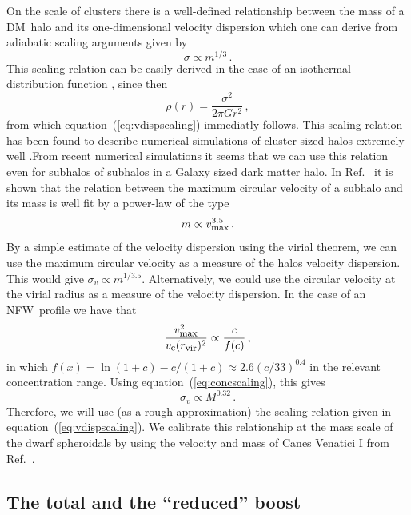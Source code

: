 \documentclass[aps,prd,twocolumn,amsmath,amssymb,floatfix,nofootinbib,10pt]{revtex4}
\newcommand{\NFW}{NFW}
\newcommand{\DM}{DM}
\newcommand{\eqnname}{equation}
\newcommand{\sigv}{\ensuremath{\sigma_v}}
\newcommand{\Rvir}{\ensuremath{r_{\mbox{{\footnotesize vir}}}}}
\newcommand{\vcirc}{\ensuremath{v_{\mbox{{\footnotesize c}}}}}
\newcommand{\vmax}{\ensuremath{v_{\mbox{{\footnotesize max}}}}}
\begin{document}
On the scale of clusters there is a well-defined relationship between
the mass of a \DM\ halo and its one-dimensional velocity dispersion
which one can derive from adiabatic scaling arguments
\cite{1998ApJ...495...80B} given by
\begin{equation}\label{eq:vdispscaling}
\sigma \propto m^{1/3}\, .
\end{equation}
This scaling relation can be easily derived in the case of an
isothermal distribution function \cite{2008gady.book.....B}, since
then
\begin{equation}
\rho(r) = \frac{\sigma^2}{2\pi G r^2}\, ,
\end{equation}
from which \eqnname\ (\ref{eq:vdispscaling}) immediatly follows. This
scaling relation has been found to describe numerical simulations of
cluster-sized halos extremely well
\cite{1991ApJ...383...95E,1995MNRAS.275..720N,1995AJ....110...21C,1996ApJ...469..494E,1996MNRAS.281..716C,1998ApJ...495...80B}.From
recent numerical simulations it seems that we can use this relation
even for subhalos of subhalos in a Galaxy sized dark matter halo. In
Ref.~\cite{2008MNRAS.391.1685S} it is shown that the relation between
the maximum circular velocity of a subhalo and its mass is well fit by
a power-law of the type
\begin{equation}
m \propto \vmax^{3.5}\, .
\end{equation}
By a simple estimate of the velocity dispersion using the virial
theorem, we can use the maximum circular velocity as a measure of the
halos velocity dispersion. This would give $\sigv \propto
m^{1/3.5}$. Alternatively, we could use the circular velocity at the
virial radius as a measure of the velocity dispersion. In the case of
an \NFW\ profile we have that
\begin{equation}
\frac{\vmax^2}{\vcirc(\Rvir)^2} \propto \frac{c}{f(c)}\, ,
\end{equation}
in which $f(x) = \ln(1+c) - c/(1+c) \approx 2.6 (c/33)^{0.4}$ in the
relevant concentration range. Using \eqnname\ (\ref{eq:concscaling}),
this gives
\begin{equation}
\sigv \propto M^{0.32}\, .
\end{equation}
Therefore, we will use (as a rough approximation) the scaling relation
given in \eqnname\ (\ref{eq:vdispscaling}). We calibrate this
relationship at the mass scale of the dwarf spheroidals by using the
velocity and mass of Canes Venatici I from Ref.~\cite{2007ApJ...670..313S}.


\subsection{The total and the ``reduced'' boost}
\end{document}
